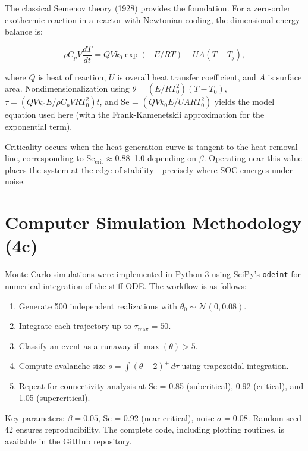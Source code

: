 \documentclass[11pt,a4paper]{article}
\begin{document}
The classical Semenov theory (1928) provides the foundation. For a zero-order exothermic reaction in a reactor with Newtonian cooling, the dimensional energy balance is:

\begin{equation}
\rho C_p V \frac{dT}{dt} = Q V k_0 \exp(-E/RT) - UA(T - T_j),
\end{equation}

where $Q$ is heat of reaction, $U$ is overall heat transfer coefficient, and $A$ is surface area. Nondimensionalization using $\theta = (E/RT_0^2)(T - T_0)$, $\tau = (Q V k_0 E / \rho C_p V R T_0^2) t$, and Se = $(Q V k_0 E / UA R T_0^2)$ yields the model equation used here (with the Frank-Kamenetskii approximation for the exponential term).

Criticality occurs when the heat generation curve is tangent to the heat removal line, corresponding to Se$_{\text{crit}} \approx 0.88$--1.0 depending on $\beta$. Operating near this value places the system at the edge of stability—precisely where SOC emerges under noise.

\section{Computer Simulation Methodology (4c)}
\label{sec:simulation}

Monte Carlo simulations were implemented in Python 3 using SciPy's \texttt{odeint} for numerical integration of the stiff ODE. The workflow is as follows:

\begin{enumerate}
\item Generate 500 independent realizations with $\theta_0 \sim \mathcal{N}(0, 0.08)$.
\item Integrate each trajectory up to $\tau_{\max} = 50$.
\item Classify an event as a runaway if $\max(\theta) > 5$.
\item Compute avalanche size $s = \int (\theta - 2)^+ \, d\tau$ using trapezoidal integration.
\item Repeat for connectivity analysis at Se = 0.85 (subcritical), 0.92 (critical), and 1.05 (supercritical).
\end{enumerate}

Key parameters: $\beta = 0.05$, Se = 0.92 (near-critical), noise $\sigma = 0.08$. Random seed 42 ensures reproducibility. The complete code, including plotting routines, is available in the GitHub repository.
\end{document}
